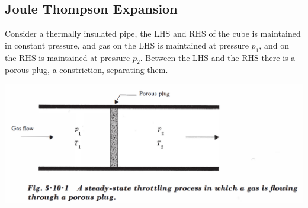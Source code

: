 \documentclass[11pt,oneside]{book}
\theoremstyle{break}
\theoremstyle{break}
\begin{document}
\newpage
\subsection{Joule Thompson Expansion}
Consider a thermally insulated pipe, the LHS and RHS of the cube is maintained in constant pressure, and gas on the LHS is maintained at pressure $p_1$, and on the RHS is maintained at pressure $p_2$. Between the LHS and the RHS there is a porous plug, a constriction, separating them. 

\begin{center}
\includegraphics[scale=0.39]{plug.png}
\end{center}
\end{document}
